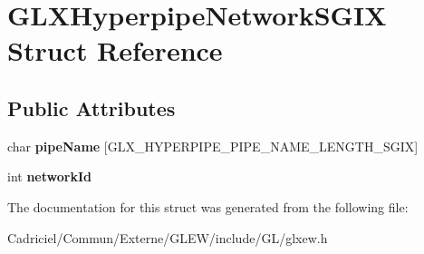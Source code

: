 \hypertarget{struct_g_l_x_hyperpipe_network_s_g_i_x}{}\section{G\+L\+X\+Hyperpipe\+Network\+S\+G\+IX Struct Reference}
\label{struct_g_l_x_hyperpipe_network_s_g_i_x}
\subsection*{Public Attributes}
\begin{DoxyCompactItemize}
\item 
char {\bfseries pipe\+Name} \mbox{[}G\+L\+X\+\_\+\+H\+Y\+P\+E\+R\+P\+I\+P\+E\+\_\+\+P\+I\+P\+E\+\_\+\+N\+A\+M\+E\+\_\+\+L\+E\+N\+G\+T\+H\+\_\+\+S\+G\+IX\mbox{]}\hypertarget{struct_g_l_x_hyperpipe_network_s_g_i_x_a6338b9717fa895aec16b932f2ef693ed}{}\label{struct_g_l_x_hyperpipe_network_s_g_i_x_a6338b9717fa895aec16b932f2ef693ed}

\item 
int {\bfseries network\+Id}\hypertarget{struct_g_l_x_hyperpipe_network_s_g_i_x_a81393053988b32fadb0b21615024add1}{}\label{struct_g_l_x_hyperpipe_network_s_g_i_x_a81393053988b32fadb0b21615024add1}

\end{DoxyCompactItemize}


The documentation for this struct was generated from the following file\+:\begin{DoxyCompactItemize}
\item 
Cadriciel/\+Commun/\+Externe/\+G\+L\+E\+W/include/\+G\+L/glxew.\+h\end{DoxyCompactItemize}
